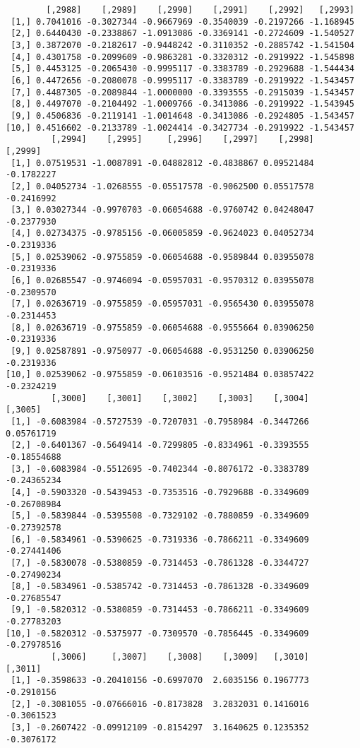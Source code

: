 \documentclass[
  letterpaper,
  DIV=11,
  numbers=noendperiod]{scrreprt}
\begin{document}
\begin{verbatim}
        [,2988]    [,2989]    [,2990]    [,2991]    [,2992]   [,2993]
 [1,] 0.7041016 -0.3027344 -0.9667969 -0.3540039 -0.2197266 -1.168945
 [2,] 0.6440430 -0.2338867 -1.0913086 -0.3369141 -0.2724609 -1.540527
 [3,] 0.3872070 -0.2182617 -0.9448242 -0.3110352 -0.2885742 -1.541504
 [4,] 0.4301758 -0.2099609 -0.9863281 -0.3320312 -0.2919922 -1.545898
 [5,] 0.4453125 -0.2065430 -0.9995117 -0.3383789 -0.2929688 -1.544434
 [6,] 0.4472656 -0.2080078 -0.9995117 -0.3383789 -0.2919922 -1.543457
 [7,] 0.4487305 -0.2089844 -1.0000000 -0.3393555 -0.2915039 -1.543457
 [8,] 0.4497070 -0.2104492 -1.0009766 -0.3413086 -0.2919922 -1.543945
 [9,] 0.4506836 -0.2119141 -1.0014648 -0.3413086 -0.2924805 -1.543457
[10,] 0.4516602 -0.2133789 -1.0024414 -0.3427734 -0.2919922 -1.543457
         [,2994]    [,2995]     [,2996]    [,2997]    [,2998]    [,2999]
 [1,] 0.07519531 -1.0087891 -0.04882812 -0.4838867 0.09521484 -0.1782227
 [2,] 0.04052734 -1.0268555 -0.05517578 -0.9062500 0.05517578 -0.2416992
 [3,] 0.03027344 -0.9970703 -0.06054688 -0.9760742 0.04248047 -0.2377930
 [4,] 0.02734375 -0.9785156 -0.06005859 -0.9624023 0.04052734 -0.2319336
 [5,] 0.02539062 -0.9755859 -0.06054688 -0.9589844 0.03955078 -0.2319336
 [6,] 0.02685547 -0.9746094 -0.05957031 -0.9570312 0.03955078 -0.2309570
 [7,] 0.02636719 -0.9755859 -0.05957031 -0.9565430 0.03955078 -0.2314453
 [8,] 0.02636719 -0.9755859 -0.06054688 -0.9555664 0.03906250 -0.2319336
 [9,] 0.02587891 -0.9750977 -0.06054688 -0.9531250 0.03906250 -0.2319336
[10,] 0.02539062 -0.9755859 -0.06103516 -0.9521484 0.03857422 -0.2324219
         [,3000]    [,3001]    [,3002]    [,3003]    [,3004]     [,3005]
 [1,] -0.6083984 -0.5727539 -0.7207031 -0.7958984 -0.3447266  0.05761719
 [2,] -0.6401367 -0.5649414 -0.7299805 -0.8334961 -0.3393555 -0.18554688
 [3,] -0.6083984 -0.5512695 -0.7402344 -0.8076172 -0.3383789 -0.24365234
 [4,] -0.5903320 -0.5439453 -0.7353516 -0.7929688 -0.3349609 -0.26708984
 [5,] -0.5839844 -0.5395508 -0.7329102 -0.7880859 -0.3349609 -0.27392578
 [6,] -0.5834961 -0.5390625 -0.7319336 -0.7866211 -0.3349609 -0.27441406
 [7,] -0.5830078 -0.5380859 -0.7314453 -0.7861328 -0.3344727 -0.27490234
 [8,] -0.5834961 -0.5385742 -0.7314453 -0.7861328 -0.3349609 -0.27685547
 [9,] -0.5820312 -0.5380859 -0.7314453 -0.7866211 -0.3349609 -0.27783203
[10,] -0.5820312 -0.5375977 -0.7309570 -0.7856445 -0.3349609 -0.27978516
         [,3006]     [,3007]    [,3008]    [,3009]   [,3010]    [,3011]
 [1,] -0.3598633 -0.20410156 -0.6997070  2.6035156 0.1967773 -0.2910156
 [2,] -0.3081055 -0.07666016 -0.8173828  3.2832031 0.1416016 -0.3061523
 [3,] -0.2607422 -0.09912109 -0.8154297  3.1640625 0.1235352 -0.3076172

\end{verbatim}
\end{document}
